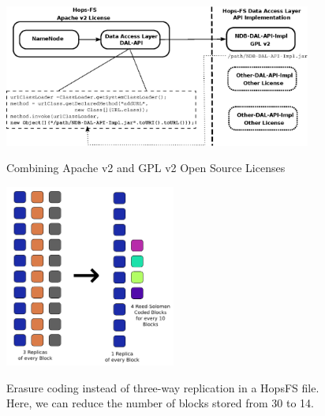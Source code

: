 \begin{figure}[h]
 \centering
 \includegraphics[width=0.9\textwidth]{./imgs/license-work-around.eps}
 \label{fig:license-work-around}
 \caption{Combining Apache v2 and GPL v2 Open Source Licenses}
\end{figure}


\begin{figure}[h]
 \centering
 \includegraphics[width=0.5\textwidth]{./imgs/erasure-coding.png}
 \label{fig:erasure-coding}
 \caption{Erasure coding instead of three-way replication in a HopsFS file. Here, we can reduce the number of blocks stored from 30 to 14.}
\end{figure}

